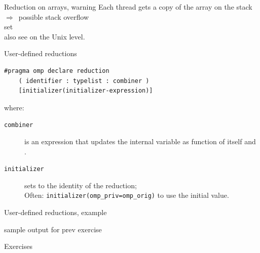 \begin{numberedframe}{Reduction on arrays, warning}
  Each thread gets a copy of the array on the stack\\
  $\Rightarrow$~possible stack overflow\\
  set \\
  also see  on the Unix level.
\end{numberedframe}

\begin{numberedframe}{User-defined reductions}
  \begin{lstlisting}[language=omp]
    #pragma omp declare reduction 
    ( identifier : typelist : combiner )
    [initializer(initializer-expression)]
  \end{lstlisting}
  where:
  \begin{description}
  \item[\texttt{combiner}] is an expression that updates the internal
    variable  as function of itself and .
  \item[\texttt{initializer}] sets  to the
    identity of the reduction;\\
    Often: \lstinline{initializer(omp_priv=omp_orig)} to use the initial value.
  \end{description}
\end{numberedframe}
\begin{numberedframe}{User-defined reductions, example}
\end{numberedframe}

\begin{exerciseframe}
  
\end{exerciseframe}

\begin{numberedframe}{sample output for prev exercise}
  
\end{numberedframe}


 {Exercises}

\begin{exerciseframe}[jacobi]
  
\end{exerciseframe}

\begin{exerciseframe}
  
\end{exerciseframe}

\begin{exerciseframe}
  
\end{exerciseframe}

\begin{exerciseframe}
  
\end{exerciseframe}

\endinput

\begin{numberedframe}{}
\begin{lstlisting}
\end{lstlisting}
  \begin{itemize}
  \item 
  \end{itemize}
\end{numberedframe}

